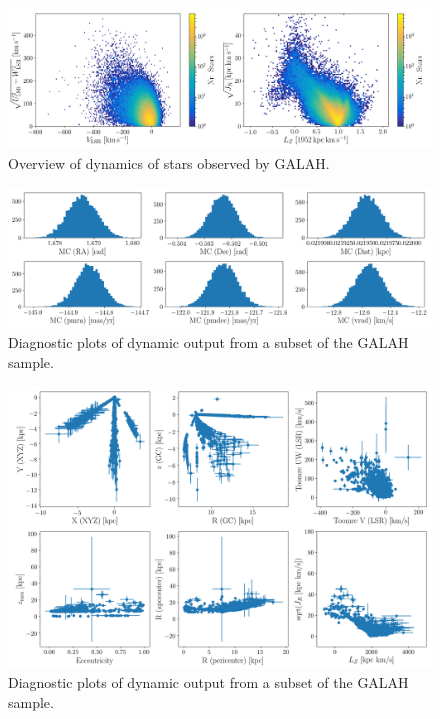 \documentclass[a4paper,11pt,english]{article}
\begin{document}
\begin{figure}[!ht]
\centering
\includegraphics[width=\textwidth]{../../dynamics/figures/action_overview_clean_all.png}
\caption{Overview of dynamics of stars observed by GALAH.}
\label{fig:dynamics_overview}
\end{figure}

\begin{figure}[!ht]
\centering
\includegraphics[width=\textwidth]{../../dynamics/figures/MC_input.png}
\caption{Diagnostic plots of dynamic output from a subset of the GALAH sample.}
\label{fig:dynamics_output}
\end{figure}

\begin{figure}[!ht]
\centering
\includegraphics[width=\textwidth]{../../dynamics/figures/MC_output.png}
\caption{Diagnostic plots of dynamic output from a subset of the GALAH sample.}
\label{fig:dynamics_input}
\end{figure}
\end{document}
